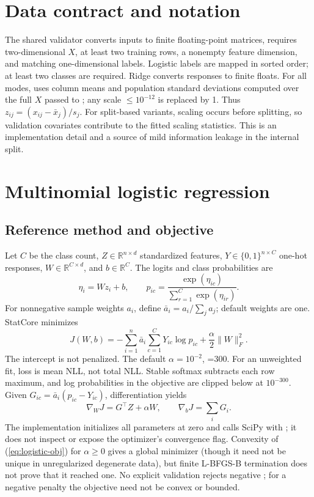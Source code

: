 \documentclass[conference]{IEEEtran}
\begin{document}
\section{Data contract and notation}
The shared validator converts inputs to finite floating-point matrices, requires two-dimensional \(X\), at least two training rows, a nonempty feature dimension, and matching one-dimensional labels. Logistic labels are mapped in sorted  order; at least two classes are required. Ridge converts responses to finite floats. For all modes,  uses column means and population standard deviations computed over the full \(X\) passed to ; any scale \(\leq10^{-12}\) is replaced by 1. Thus \(z_{ij}=(x_{ij}-\bar{x}_j)/s_j\). For split-based variants, scaling occurs before splitting, so validation covariates contribute to the fitted scaling statistics. This is an implementation detail and a source of mild information leakage in the internal split.

\section{Multinomial logistic regression}
\subsection{Reference method and objective}
Let \(C\) be the class count, \(Z\in\mathbb R^{n\times d}\) standardized features, \(Y\in\{0,1\}^{n\times C}\) one-hot responses, \(W\in\mathbb R^{C\times d}\), and \(b\in\mathbb R^C\). The logits and class probabilities are
\begin{equation}
\eta_i=Wz_i+b,\qquad p_{ic}=\frac{\exp(\eta_{ic})}{\sum_{r=1}^C\exp(\eta_{ir})}.
\label{eq:softmax}
\end{equation}
For nonnegative sample weights \(a_i\), define \(\bar a_i=a_i/\sum_j a_j\); default weights are one. StatCore minimizes
\begin{equation}
J(W,b)=-\sum_{i=1}^n\bar a_i\sum_{c=1}^C Y_{ic}\log p_{ic}
+\frac{\alpha}{2}\|W\|_F^2.
\label{eq:logistic-obj}
\end{equation}
The intercept is not penalized. The default \(\alpha=10^{-2}\), =300. For an unweighted fit, loss is mean NLL, not total NLL. Stable softmax subtracts each row maximum, and log probabilities in the objective are clipped below at \(10^{-300}\). Given \(G_{ic}=\bar a_i(p_{ic}-Y_{ic})\), differentiation yields
\begin{equation}
\nabla_WJ=G^\top Z+\alpha W,\qquad \nabla_bJ=\sum_iG_i.
\label{eq:logistic-grad}
\end{equation}
The implementation initializes all parameters at zero and calls SciPy  with ; it does not inspect or expose the optimizer's convergence flag. Convexity of (\ref{eq:logistic-obj}) for \(\alpha\geq0\) gives a global minimizer (though it need not be unique in unregularized degenerate data), but finite L-BFGS-B termination does not prove that it reached one. No explicit validation rejects negative ; for a negative penalty the objective need not be convex or bounded.
\end{document}
